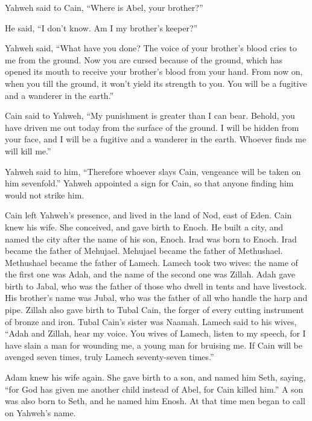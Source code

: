  Yahweh said to Cain, ``Where is Abel, your brother?''

He said, ``I don't know. Am I my brother's keeper?''

 Yahweh said, ``What have you done? The voice of your
brother's blood cries to me from the ground.  Now you are
cursed because of the ground, which has opened its mouth to receive your
brother's blood from your hand.  From now on, when you till
the ground, it won't yield its strength to you. You will be a fugitive
and a wanderer in the earth.''

 Cain said to Yahweh, ``My punishment is greater than I can
bear.  Behold, you have driven me out today from the
surface of the ground. I will be hidden from your face, and I will be a
fugitive and a wanderer in the earth. Whoever finds me will kill me.''

 Yahweh said to him, ``Therefore whoever slays Cain,
vengeance will be taken on him sevenfold.'' Yahweh appointed a sign for
Cain, so that anyone finding him would not strike him.

 Cain left Yahweh's presence, and lived in the land of Nod,
east of Eden.  Cain knew his wife. She conceived, and gave
birth to Enoch. He built a city, and named the city after the name of
his son, Enoch.  Irad was born to Enoch. Irad became the
father of Mehujael. Mehujael became the father of Methushael. Methushael
became the father of Lamech.  Lamech took two wives: the
name of the first one was Adah, and the name of the second one was
Zillah.  Adah gave birth to Jabal, who was the father of
those who dwell in tents and have livestock.  His brother's
name was Jubal, who was the father of all who handle the harp and pipe.
 Zillah also gave birth to Tubal Cain, the forger of every
cutting instrument of bronze and iron. Tubal Cain's sister was Naamah.
 Lamech said to his wives, ``Adah and Zillah, hear my
voice. You wives of Lamech, listen to my speech, for I have slain a man
for wounding me, a young man for bruising me.  If Cain will
be avenged seven times, truly Lamech seventy-seven times.''

 Adam knew his wife again. She gave birth to a son, and
named him Seth, saying, ``for God has given me another child instead of
Abel, for Cain killed him.''  A son was also born to Seth,
and he named him Enosh. At that time men began to call on Yahweh's name.

